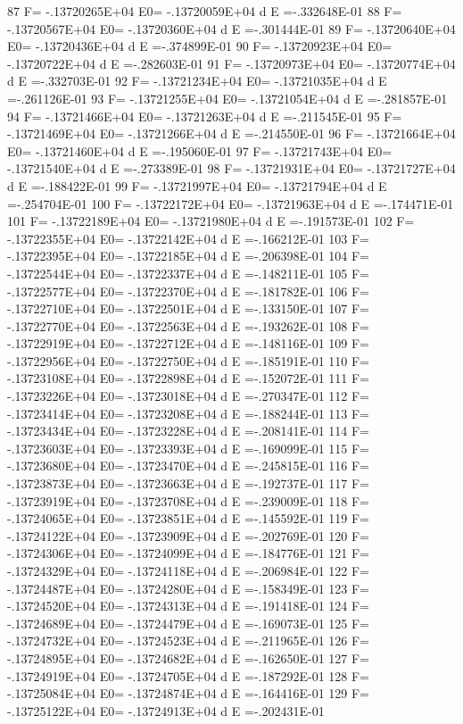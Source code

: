   87 F= -.13720265E+04 E0= -.13720059E+04  d E =-.332648E-01
  88 F= -.13720567E+04 E0= -.13720360E+04  d E =-.301444E-01
  89 F= -.13720640E+04 E0= -.13720436E+04  d E =-.374899E-01
  90 F= -.13720923E+04 E0= -.13720722E+04  d E =-.282603E-01
  91 F= -.13720973E+04 E0= -.13720774E+04  d E =-.332703E-01
  92 F= -.13721234E+04 E0= -.13721035E+04  d E =-.261126E-01
  93 F= -.13721255E+04 E0= -.13721054E+04  d E =-.281857E-01
  94 F= -.13721466E+04 E0= -.13721263E+04  d E =-.211545E-01
  95 F= -.13721469E+04 E0= -.13721266E+04  d E =-.214550E-01
  96 F= -.13721664E+04 E0= -.13721460E+04  d E =-.195060E-01
  97 F= -.13721743E+04 E0= -.13721540E+04  d E =-.273389E-01
  98 F= -.13721931E+04 E0= -.13721727E+04  d E =-.188422E-01
  99 F= -.13721997E+04 E0= -.13721794E+04  d E =-.254704E-01
 100 F= -.13722172E+04 E0= -.13721963E+04  d E =-.174471E-01
 101 F= -.13722189E+04 E0= -.13721980E+04  d E =-.191573E-01
 102 F= -.13722355E+04 E0= -.13722142E+04  d E =-.166212E-01
 103 F= -.13722395E+04 E0= -.13722185E+04  d E =-.206398E-01
 104 F= -.13722544E+04 E0= -.13722337E+04  d E =-.148211E-01
 105 F= -.13722577E+04 E0= -.13722370E+04  d E =-.181782E-01
 106 F= -.13722710E+04 E0= -.13722501E+04  d E =-.133150E-01
 107 F= -.13722770E+04 E0= -.13722563E+04  d E =-.193262E-01
 108 F= -.13722919E+04 E0= -.13722712E+04  d E =-.148116E-01
 109 F= -.13722956E+04 E0= -.13722750E+04  d E =-.185191E-01
 110 F= -.13723108E+04 E0= -.13722898E+04  d E =-.152072E-01
 111 F= -.13723226E+04 E0= -.13723018E+04  d E =-.270347E-01
 112 F= -.13723414E+04 E0= -.13723208E+04  d E =-.188244E-01
 113 F= -.13723434E+04 E0= -.13723228E+04  d E =-.208141E-01
 114 F= -.13723603E+04 E0= -.13723393E+04  d E =-.169099E-01
 115 F= -.13723680E+04 E0= -.13723470E+04  d E =-.245815E-01
 116 F= -.13723873E+04 E0= -.13723663E+04  d E =-.192737E-01
 117 F= -.13723919E+04 E0= -.13723708E+04  d E =-.239009E-01
 118 F= -.13724065E+04 E0= -.13723851E+04  d E =-.145592E-01
 119 F= -.13724122E+04 E0= -.13723909E+04  d E =-.202769E-01
 120 F= -.13724306E+04 E0= -.13724099E+04  d E =-.184776E-01
 121 F= -.13724329E+04 E0= -.13724118E+04  d E =-.206984E-01
 122 F= -.13724487E+04 E0= -.13724280E+04  d E =-.158349E-01
 123 F= -.13724520E+04 E0= -.13724313E+04  d E =-.191418E-01
 124 F= -.13724689E+04 E0= -.13724479E+04  d E =-.169073E-01
 125 F= -.13724732E+04 E0= -.13724523E+04  d E =-.211965E-01
 126 F= -.13724895E+04 E0= -.13724682E+04  d E =-.162650E-01
 127 F= -.13724919E+04 E0= -.13724705E+04  d E =-.187292E-01
 128 F= -.13725084E+04 E0= -.13724874E+04  d E =-.164416E-01
 129 F= -.13725122E+04 E0= -.13724913E+04  d E =-.202431E-01
